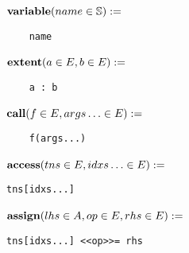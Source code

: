 \begin{minipage}{0.6\linewidth}
    \noindent\begin{minipage}{.5\linewidth}
    \raggedleft $\text{\textbf{variable}}(name \in \mathbb{S}) :=$~
    \end{minipage}%
    \begin{minipage}{.5\linewidth}
    \begin{verbatim}
    name
    \end{verbatim}
    \end{minipage}

    \noindent\begin{minipage}{.5\linewidth}
    \raggedleft $\text{\textbf{extent}}(a \in E, b \in E) :=$~
    \end{minipage}%
    \begin{minipage}{.5\linewidth}
    \begin{verbatim}
    a : b
    \end{verbatim}
    \end{minipage}

    \noindent\begin{minipage}{.5\linewidth}
    \raggedleft $\text{\textbf{call}}(f \in E, args\ldots \in E) :=$~
    \end{minipage}%
    \begin{minipage}{.5\linewidth}
    \begin{verbatim}
    f(args...)
    \end{verbatim}
    \end{minipage}
\end{minipage}

\noindent\begin{minipage}{.5\linewidth}
\raggedleft $\text{\textbf{access}}(tns \in E, idxs\ldots \in E) :=$~
\end{minipage}%
\begin{minipage}{.5\linewidth}
\begin{verbatim}
tns[idxs...]
\end{verbatim}
\end{minipage}

\noindent\begin{minipage}{.5\linewidth}
\raggedleft $\text{\textbf{assign}}(lhs \in A, op \in E, rhs \in E) :=$~
\end{minipage}%
\begin{minipage}{.5\linewidth}
\begin{verbatim}
tns[idxs...] <<op>>= rhs
\end{verbatim}
\end{minipage}

